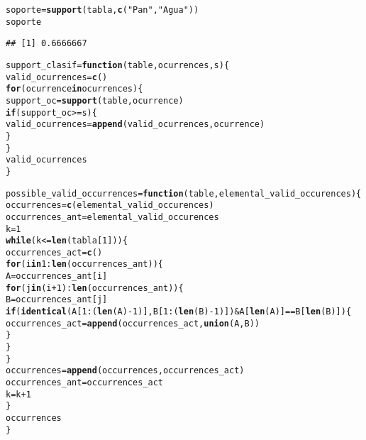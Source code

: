 \documentclass[12pt]{report}\usepackage[]{graphicx}\usepackage[dvipsnames]{xcolor}
\makeatletter
\newcommand{\hlnum}[1]{\textcolor[rgb]{0.686,0.059,0.569}{#1}}%
\newcommand{\hlstr}[1]{\textcolor[rgb]{0.192,0.494,0.8}{#1}}%
\newcommand{\hlopt}[1]{\textcolor[rgb]{0,0,0}{#1}}%
\newcommand{\hlstd}[1]{\textcolor[rgb]{0.345,0.345,0.345}{#1}}%
\newcommand{\hlkwa}[1]{\textcolor[rgb]{0.161,0.373,0.58}{\textbf{#1}}}%
\newcommand{\hlkwb}[1]{\textcolor[rgb]{0.69,0.353,0.396}{#1}}%
\newcommand{\hlkwc}[1]{\textcolor[rgb]{0.333,0.667,0.333}{#1}}%
\newcommand{\hlkwd}[1]{\textcolor[rgb]{0.737,0.353,0.396}{\textbf{#1}}}%
\newenvironment{kframe}{%
 \def\at@end@of@kframe{}%
 \ifinner\ifhmode%
  \def\at@end@of@kframe{\end{minipage}}%
  \begin{minipage}{\columnwidth}%
 \fi\fi%
 \def\FrameCommand##1{\hskip\@totalleftmargin \hskip-\fboxsep
 \colorbox{shadecolor}{##1}\hskip-\fboxsep
     \hskip-\linewidth \hskip-\@totalleftmargin \hskip\columnwidth}%
 \MakeFramed {\advance\hsize-\width
   \@totalleftmargin\z@ \linewidth\hsize
   \@setminipage}}%
 {\par\unskip\endMakeFramed%
 \at@end@of@kframe}
\newenvironment{knitrout}{}{} %
\makeatother
\begin{document}
\begin{knitrout}
\begin{kframe}
\begin{alltt}
\hlstd{soporte} \hlkwb{=} \hlkwd{support}\hlstd{(tabla,} \hlkwd{c}\hlstd{(}\hlstr{"Pan"}\hlstd{,}\hlstr{"Agua"}\hlstd{))}
\hlstd{soporte}
\end{alltt}
\begin{verbatim}
## [1] 0.6666667
\end{verbatim}
\begin{alltt}
\hlstd{support_clasif} \hlkwb{=} \hlkwa{function}\hlstd{(}\hlkwc{table}\hlstd{,} \hlkwc{ocurrences}\hlstd{,} \hlkwc{s}\hlstd{)\{}
        \hlstd{valid_ocurrences} \hlkwb{=} \hlkwd{c}\hlstd{()}
        \hlkwa{for} \hlstd{(ocurrence} \hlkwa{in} \hlstd{ocurrences)\{}
                \hlstd{support_oc} \hlkwb{=} \hlkwd{support}\hlstd{(table, ocurrence)}
                \hlkwa{if} \hlstd{(support_oc} \hlopt{>=} \hlstd{s)\{}
                        \hlstd{valid_ocurrences} \hlkwb{=} \hlkwd{append}\hlstd{(valid_ocurrences, ocurrence)}
                \hlstd{\}}
        \hlstd{\}}
        \hlstd{valid_ocurrences}
\hlstd{\}}

\hlstd{possible_valid_occurrences} \hlkwb{=} \hlkwa{function}\hlstd{(}\hlkwc{table}\hlstd{,} \hlkwc{elemental_valid_occurences}\hlstd{) \{}
        \hlstd{occurrences} \hlkwb{=} \hlkwd{c}\hlstd{(elemental_valid_occurences)}
        \hlstd{occurrences_ant} \hlkwb{=} \hlstd{elemental_valid_occurences}
        \hlstd{k} \hlkwb{=} \hlnum{1}
        \hlkwa{while} \hlstd{(k} \hlopt{<=} \hlkwd{len}\hlstd{(tabla[}\hlnum{1}\hlstd{])) \{}
                \hlstd{occurrences_act} \hlkwb{=} \hlkwd{c}\hlstd{()}
                \hlkwa{for} \hlstd{(i} \hlkwa{in} \hlnum{1}\hlopt{:}\hlkwd{len}\hlstd{(occurrences_ant)) \{}
                        \hlstd{A} \hlkwb{=} \hlstd{occurrences_ant[i]}
                        \hlkwa{for} \hlstd{(j} \hlkwa{in} \hlstd{(i}\hlopt{+}\hlnum{1}\hlstd{)}\hlopt{:}\hlkwd{len}\hlstd{(occurrences_ant)) \{}
                                \hlstd{B} \hlkwb{=} \hlstd{occurrences_ant[j]}
                                \hlkwa{if} \hlstd{(}\hlkwd{identical}\hlstd{(A[}\hlnum{1}\hlopt{:}\hlstd{(}\hlkwd{len}\hlstd{(A)}\hlopt{-}\hlnum{1}\hlstd{)], B[}\hlnum{1}\hlopt{:}\hlstd{(}\hlkwd{len}\hlstd{(B)}\hlopt{-}\hlnum{1}\hlstd{)])} \hlopt{&} \hlstd{A[}\hlkwd{len}\hlstd{(A)]} \hlopt{==} \hlstd{B[}\hlkwd{len}\hlstd{(B)]) \{}
                                        \hlstd{occurrences_act} \hlkwb{=} \hlkwd{append}\hlstd{(occurrences_act,} \hlkwd{union}\hlstd{(A, B))}
                                \hlstd{\}}
                        \hlstd{\}}
                \hlstd{\}}
                \hlstd{occurrences} \hlkwb{=} \hlkwd{append}\hlstd{(occurrences, occurrences_act)}
                \hlstd{occurrences_ant} \hlkwb{=} \hlstd{occurrences_act}
                \hlstd{k} \hlkwb{=} \hlstd{k}\hlopt{+}\hlnum{1}
        \hlstd{\}}
        \hlstd{occurrences}
\hlstd{\}}


\end{alltt}
\end{kframe}
\end{knitrout}
\end{document}

